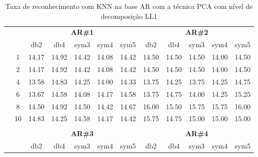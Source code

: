 \begin{table}[htpb]
	\centering
    \normalsize
	\caption{Taxa de reconhecimento com KNN na base AR com a técnica PCA com nível de decomposição LL1}
	\begin{tabular}{|c|c|c c c c c|c c c c c|}
\cline{3-12}
\multicolumn{2}{c|}{\multirow{2}{*}{}} & \multicolumn{5}{c|}{\textbf{AR\#1}}  & \multicolumn{5}{c|}{\textbf{AR\#2}} \\\cline{3-12}

\multicolumn{2}{c|}{}  & db2 & db4 & sym3 & sym4 & sym5 & db2 & db4& sym3 & sym4 & sym5 \\\hline

\multicolumn{1}{|c|}{ \multirow{5}{*}{\rotatebox[origin=c]{90}{\textbf{K-vizinhos}}} }
&1	&14.17	&14.92	&14.42	&14.08	&14.42	&14.50	&14.50	&14.50	&14.00	&14.50	\\\cline{2-12}
&2	&14.17	&14.92	&14.42	&14.08	&14.42	&14.50	&14.50	&14.50	&14.00	&14.50	\\\cline{2-12}
&4	&13.58	&14.83	&14.25	&14.00	&14.33	&13.75	&14.25	&13.75	&14.25	&14.75	\\\cline{2-12}
&6	&13.67	&14.58	&14.08	&14.17	&14.58	&13.75	&14.75	&14.00	&14.25	&15.25	\\\cline{2-12}
&8	&14.50	&14.92	&14.50	&14.42	&14.67	&16.00	&15.50	&15.75	&15.75	&16.00	\\\cline{2-12}
&10	&14.83	&14.25	&14.58	&14.17	&14.42	&15.75	&14.75	&15.00	&15.00	&15.00	

\\ \midrule
\multicolumn{12}{c}{}\\ 




\cline{3-12}
\multicolumn{2}{c}{} & \multicolumn{5}{|c|}{\textbf{AR\#3}}  & \multicolumn{5}{c|}{\textbf{AR\#4}} \\\cline{3-12}
\multicolumn{2}{c}{}  & \multicolumn{1}{|c}{db2} & db4 & sym3 & sym4 & sym5 & db2 & db4& sym3 & sym4 & sym5 \\\hline


\end{tabular}
\end{table}
